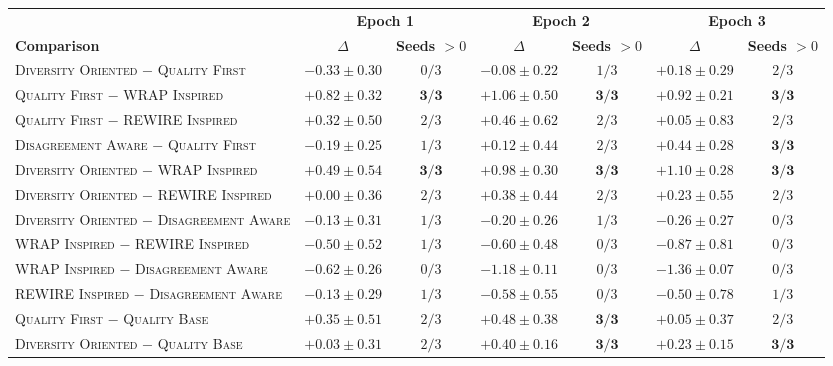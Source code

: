 \begin{table}[t]
\begin{tabular}{lcccccc}
\toprule
& \multicolumn{2}{c}{\textbf{Epoch 1}} & \multicolumn{2}{c}{\textbf{Epoch 2}} & \multicolumn{2}{c}{\textbf{Epoch 3}} \\
\cmidrule(lr){2-3}\cmidrule(lr){4-5}\cmidrule(lr){6-7}
\textbf{Comparison} & \textbf{$\Delta$} & \textbf{Seeds $>0$} & \textbf{$\Delta$} & \textbf{Seeds $>0$} & \textbf{$\Delta$} & \textbf{Seeds $>0$} \\
\midrule
\textsc{Diversity Oriented} $-$ \textsc{Quality First} & $-0.33 \pm 0.30$ & $0/3$ & $-0.08 \pm 0.22$ & $1/3$ & $+0.18 \pm 0.29$ & $2/3$ \\
\textsc{Quality First} $-$ \textsc{WRAP Inspired} & $+0.82 \pm 0.32$ & $\mathbf{3/3}$ & $+1.06 \pm 0.50$ & $\mathbf{3/3}$ & $+0.92 \pm 0.21$ & $\mathbf{3/3}$ \\
\textsc{Quality First} $-$ \textsc{REWIRE Inspired} & $+0.32 \pm 0.50$ & $2/3$ & $+0.46 \pm 0.62$ & $2/3$ & $+0.05 \pm 0.83$ & $2/3$ \\
\textsc{Disagreement Aware} $-$ \textsc{Quality First} & $-0.19 \pm 0.25$ & $1/3$ & $+0.12 \pm 0.44$ & $2/3$ & $+0.44 \pm 0.28$ & $\mathbf{3/3}$ \\
\textsc{Diversity Oriented} $-$ \textsc{WRAP Inspired} & $+0.49 \pm 0.54$ & $\mathbf{3/3}$ & $+0.98 \pm 0.30$ & $\mathbf{3/3}$ & $+1.10 \pm 0.28$ & $\mathbf{3/3}$ \\
\textsc{Diversity Oriented} $-$ \textsc{REWIRE Inspired} & $+0.00 \pm 0.36$ & $2/3$ & $+0.38 \pm 0.44$ & $2/3$ & $+0.23 \pm 0.55$ & $2/3$ \\
\textsc{Diversity Oriented} $-$ \textsc{Disagreement Aware} & $-0.13 \pm 0.31$ & $1/3$ & $-0.20 \pm 0.26$ & $1/3$ & $-0.26 \pm 0.27$ & $0/3$ \\
\textsc{WRAP Inspired} $-$ \textsc{REWIRE Inspired} & $-0.50 \pm 0.52$ & $1/3$ & $-0.60 \pm 0.48$ & $0/3$ & $-0.87 \pm 0.81$ & $0/3$ \\
\textsc{WRAP Inspired} $-$ \textsc{Disagreement Aware} & $-0.62 \pm 0.26$ & $0/3$ & $-1.18 \pm 0.11$ & $0/3$ & $-1.36 \pm 0.07$ & $0/3$ \\
\textsc{REWIRE Inspired} $-$ \textsc{Disagreement Aware} & $-0.13 \pm 0.29$ & $1/3$ & $-0.58 \pm 0.55$ & $0/3$ & $-0.50 \pm 0.78$ & $1/3$ \\
\midrule
\textsc{Quality First} $-$ \textsc{Quality Base} & $+0.35 \pm 0.51$ & $2/3$ & $+0.48 \pm 0.38$ & $\mathbf{3/3}$ & $+0.05 \pm 0.37$ & $2/3$ \\
\textsc{Diversity Oriented} $-$ \textsc{Quality Base} & $+0.03 \pm 0.31$ & $2/3$ & $+0.40 \pm 0.16$ & $\mathbf{3/3}$ & $+0.23 \pm 0.15$ & $\mathbf{3/3}$ \\

\end{tabular}
\end{table}
